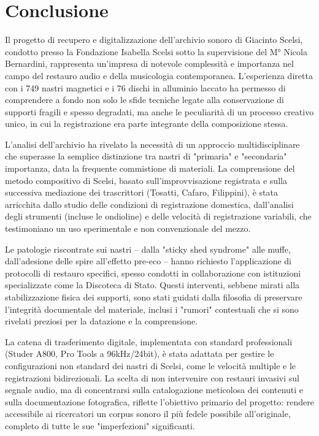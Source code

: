 \section{Conclusione}

Il progetto di recupero e digitalizzazione dell'archivio sonoro di Giacinto Scelsi, condotto presso la Fondazione Isabella Scelsi sotto la supervisione del M° Nicola Bernardini, rappresenta un'impresa di notevole complessità e importanza nel campo del restauro audio e della musicologia contemporanea. L'esperienza diretta con i 749 nastri magnetici e i 76 dischi in alluminio laccato ha permesso di comprendere a fondo non solo le sfide tecniche legate alla conservazione di supporti fragili e spesso degradati, ma anche le peculiarità di un processo creativo unico, in cui la registrazione era parte integrante della composizione stessa.

L'analisi dell'archivio ha rivelato la necessità di un approccio multidisciplinare che superasse la semplice distinzione tra nastri di "primaria" e "secondaria" importanza, data la frequente commistione di materiali. La comprensione del metodo compositivo di Scelsi, basato sull'improvvisazione registrata e sulla successiva mediazione dei trascrittori (Tosatti, Cafaro, Filippini), è stata arricchita dallo studio delle condizioni di registrazione domestica, dall'analisi degli strumenti (incluse le ondioline) e delle velocità di registrazione variabili, che testimoniano un uso sperimentale e non convenzionale del mezzo.

Le patologie riscontrate sui nastri – dalla "sticky shed syndrome" alle muffe, dall'adesione delle spire all'effetto pre-eco – hanno richiesto l'applicazione di protocolli di restauro specifici, spesso condotti in collaborazione con istituzioni specializzate come la Discoteca di Stato. Questi interventi, sebbene mirati alla stabilizzazione fisica dei supporti, sono stati guidati dalla filosofia di preservare l'integrità documentale del materiale, inclusi i "rumori" contestuali che si sono rivelati preziosi per la datazione e la comprensione.

La catena di trasferimento digitale, implementata con standard professionali (Studer A800, Pro Tools a 96kHz/24bit), è stata adattata per gestire le configurazioni non standard dei nastri di Scelsi, come le velocità multiple e le registrazioni bidirezionali. La scelta di non intervenire con restauri invasivi sul segnale audio, ma di concentrarsi sulla catalogazione meticolosa dei contenuti e sulla documentazione fotografica, riflette l'obiettivo primario del progetto: rendere accessibile ai ricercatori un corpus sonoro il più fedele possibile all'originale, completo di tutte le sue "imperfezioni" significanti.


